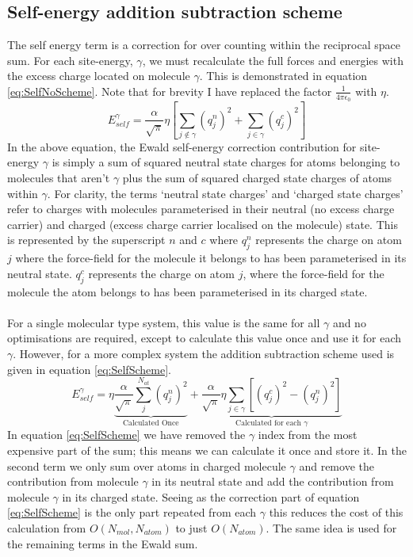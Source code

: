 \subsection{Self-energy addition subtraction scheme}
The self energy term is a correction for over counting within the reciprocal space sum. For each site-energy, $\gamma$, we must recalculate the full forces and energies with the excess charge located on molecule $\gamma$. This is demonstrated in equation \eqref{eq:SelfNoScheme}. Note that for brevity I have replaced the factor $\frac{1}{4 \pi \epsilon_0}$ with $\eta$.
\begin{equation}
  E_{self}^{\gamma} = \frac{\alpha}{\sqrt{\pi}} \eta \left[\sum_{j \not\in \gamma} \left(q^{n}_{j}\right)^2  + \sum_{j \in \gamma} \left(q^{c}_{j}\right)^2\right]
  \label{eq:SelfNoScheme}
\end{equation}
In the above equation, the Ewald self-energy correction contribution for site-energy $\gamma$ is simply a sum of squared neutral state charges for atoms belonging to molecules that aren't $\gamma$ plus the sum of squared charged state charges of atoms within $\gamma$. For clarity, the terms `neutral state charges' and `charged state charges' refer to charges with molecules parameterised in their neutral (no excess charge carrier) and charged (excess charge carrier localised on the molecule) state. This is represented by the superscript $n$ and $c$ where $q^{n}_{j}$ represents the charge on atom $j$ where the force-field for the molecule it belongs to has been parameterised in its neutral state. $q^{c}_{j}$ represents the charge on atom $j$, where the force-field for the molecule the atom belongs to has been parameterised in its charged state.
\\\\
For a single molecular type system, this value is the same for all $\gamma$ and no optimisations are required, except to calculate this value once and use it for each $\gamma$. However, for a more complex system the addition subtraction scheme used is given in equation \eqref{eq:SelfScheme}.
\begin{equation}
  E_{self}^{\gamma} = \eta \underbrace{\frac{\alpha}{\sqrt{\pi}} \sum_{j}^{N_{at}}\left(q_{j}^{n}\right)^2}_{\text{Calculated Once}} + \underbrace{\frac{\alpha}{\sqrt{\pi}} \eta \sum_{j \in \gamma} \left[ (q^{c}_{j})^2 - (q^{n}_{j})^2 \right]}_{\text{Calculated for each $\gamma$}}
  \label{eq:SelfScheme}
\end{equation}
In equation \eqref{eq:SelfScheme} we have removed the $\gamma$ index from the most expensive part of the sum; this means we can calculate it once and store it. In the second term we only sum over atoms in charged molecule $\gamma$ and remove the contribution from molecule $\gamma$ in its neutral state and add the contribution from molecule $\gamma$ in its charged state. Seeing as the correction part of equation \eqref{eq:SelfScheme} is the only part repeated from each $\gamma$ this reduces the cost of this calculation from $O(N_{mol}, N_{atom})$ to just $O(N_{atom})$. The same idea is used for the remaining terms in the Ewald sum.
